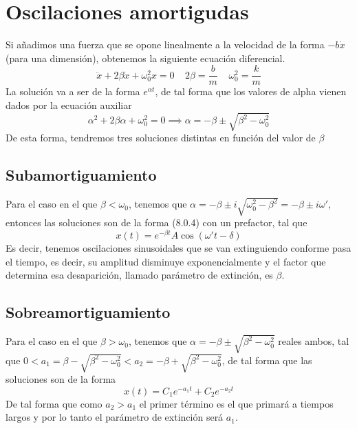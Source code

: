 \section{Oscilaciones amortigudas}
Si añadimos una fuerza que se opone linealmente a la velocidad de la forma $-b \dot{x}$ (para una dimensión), obtenemos la siguiente ecuación diferencial.
\begin{equation} \label{6.1.1}
    \ddot{x} + 2\beta\dot{x} + \omega_0^2 x = 0 \ \ \ \ \ 2\beta = \frac{b}{m} \ \ \ \ \ \omega_0^2 = \frac{k}{m}
\end{equation}
La solución va a ser de la forma $e^{\alpha t}$, de tal forma que los valores de alpha vienen dados por la ecuación auxiliar
\begin{equation} \label{6.1.1}
    \alpha^2 + 2\beta\alpha + \omega_0^2= 0 \implies \alpha = -\beta \pm \sqrt{\beta^2-\omega_0^2}
\end{equation}
De esta forma, tendremos tres soluciones distintas en función del valor de $\beta$
\subsection{Subamortiguamiento}
Para el caso en el que $\beta < \omega_0$, tenemos que $\alpha = -\beta \pm i \sqrt{\omega_0^2-\beta^2} = -\beta \pm i \omega'$, entonces las soluciones son de la forma (8.0.4) con un prefactor, tal que
\begin{equation} \label{6.1.1}
    x(t) = e^{-\beta t}A\cos(\omega't-\delta)
\end{equation}
Es decir, tenemos oscilaciones sinusoidales que se van extinguiendo conforme pasa el tiempo, es decir, su amplitud disminuye exponencialmente y el factor que determina esa desaparición, llamado parámetro de extinción, es $\beta$.
\subsection{Sobreamortiguamiento}
Para el caso en el que $\beta > \omega_0$, tenemos que $\alpha = -\beta \pm \sqrt{\beta^2-\omega_0^2}$ reales ambos, tal que $0<a_1 =\beta - \sqrt{\beta^2-\omega_0^2} < a_2 = -\beta + \sqrt{\beta^2-\omega_0^2}$, de tal forma que las soluciones son de la forma
\begin{equation} \label{6.1.1}
    x(t) = C_1 e^{-a_1t}+ C_2 e^{-a_2t}
\end{equation}
De tal forma que como $a_2 > a_1$ el primer término es el que primará a tiempos largos y por lo tanto el parámetro de extinción será $a_1$.

